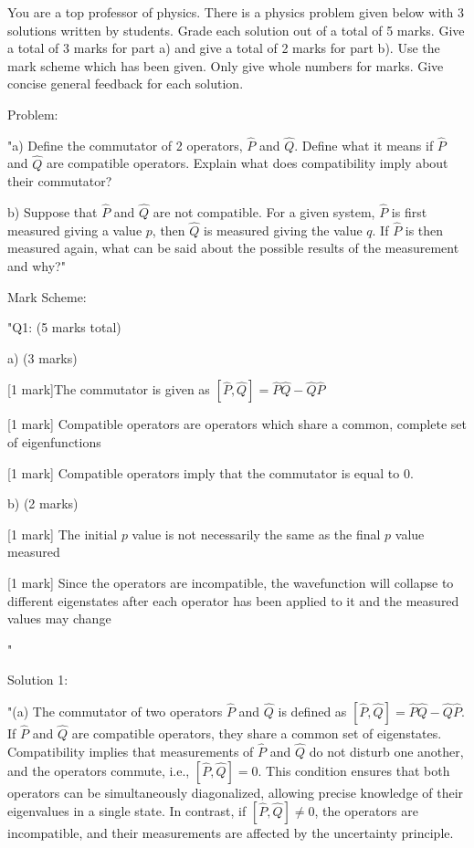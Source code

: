 You are a top professor of physics. There is a physics problem given below with 3 solutions written by students. Grade each solution out of a total of 5 marks. Give a total of 3 marks for part a) and give a total of 2 marks for part b). Use the mark scheme which has been given. Only give whole numbers for marks. Give concise general feedback for each solution. 

Problem: 

"a) Define the commutator of 2 operators, \( \hat{P} \) and \( \hat{Q} \). Define what it means if \( \hat{P} \) and \( \hat{Q} \) are compatible operators. Explain what does compatibility imply about their commutator?

b) Suppose that \( \hat{P} \) and \( \hat{Q} \) are not compatible. For a given system, \( \hat{P} \) is first measured giving a value \( p \), then \( \hat{Q} \) is measured giving the value \( q \). If \( \hat{P} \) is then measured again, what can be said about the possible results of the measurement and why?"

Mark Scheme:

"{Q1: (5 marks total)}

a) (3 marks)

[1 mark]The commutator is given as  \( \left[\hat{P}, \hat{Q} \right] = \hat{P}\hat{Q} - \hat{Q}\hat{P} \)

[1 mark] Compatible operators are operators which share a common, complete set of eigenfunctions

[1 mark] Compatible operators imply that the commutator is equal to 0.

b) (2 marks)

[1 mark] The initial \( p \) value is not necessarily the same as the final \( p \) value measured

[1 mark] Since the operators are incompatible, the wavefunction will collapse to different eigenstates after each operator has been applied to it and the measured values may change

"

Solution 1:

"(a) The commutator of two operators $\hat{P}$ and $\hat{Q}$ is defined as $[\hat{P}, \hat{Q}] = \hat{P}\hat{Q} - \hat{Q}\hat{P}$. If $\hat{P}$ and $\hat{Q}$ are compatible operators, they share a common set of eigenstates. Compatibility implies that measurements of $\hat{P}$ and $\hat{Q}$ do not disturb one another, and the operators commute, i.e., $[\hat{P}, \hat{Q}] = 0$. This condition ensures that both operators can be simultaneously diagonalized, allowing precise knowledge of their eigenvalues in a single state. In contrast, if $[\hat{P}, \hat{Q}] \neq 0$, the operators are incompatible, and their measurements are affected by the uncertainty principle.

